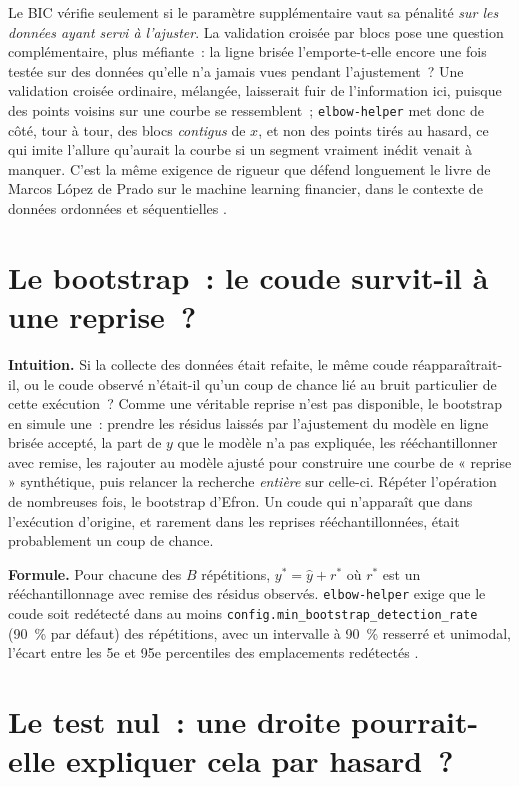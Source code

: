\documentclass[11pt]{article}
\newcommand{\code}[1]{\texttt{#1}}
\begin{document}
Le BIC vérifie seulement si le paramètre supplémentaire vaut sa pénalité
\emph{sur les données ayant servi à l'ajuster}. La validation croisée par
blocs pose une question complémentaire, plus méfiante~: la ligne brisée
l'emporte-t-elle encore une fois testée sur des données qu'elle n'a jamais
vues pendant l'ajustement~? Une validation croisée ordinaire, mélangée,
laisserait fuir de l'information ici, puisque des points voisins sur une
courbe se ressemblent~; \code{elbow-helper} met donc de côté, tour à tour,
des blocs \emph{contigus} de $x$, et non des points tirés au hasard, ce qui
imite l'allure qu'aurait la courbe si un segment vraiment inédit venait à
manquer. C'est la même exigence de rigueur que défend longuement le livre
de Marcos L\'opez de Prado sur le machine learning financier, dans le
contexte de données ordonnées et séquentielles
\citeyearpar{lopezdeprado2018financial}.

\section{Le bootstrap~: le coude survit-il à une reprise~?}

\textbf{Intuition.} Si la collecte des données était refaite, le même
coude réapparaîtrait-il, ou le coude observé n'était-il qu'un coup de
chance lié au bruit particulier de cette exécution~? Comme une véritable
reprise n'est pas disponible, le bootstrap en simule une~: prendre les
résidus laissés par l'ajustement du modèle en ligne brisée accepté, la part
de $y$ que le modèle n'a pas expliquée, les rééchantillonner avec remise,
les rajouter au modèle ajusté pour construire une courbe de « reprise »
synthétique, puis relancer la recherche \emph{entière} sur celle-ci.
Répéter l'opération de nombreuses fois, le bootstrap d'Efron. Un coude qui
n'apparaît que dans l'exécution d'origine, et rarement dans les reprises
rééchantillonnées, était probablement un coup de chance.

\textbf{Formule.} Pour chacune des $B$ répétitions, $y^\ast = \hat y +
r^\ast$ où $r^\ast$ est un rééchantillonnage avec remise des résidus
observés. \code{elbow-helper} exige que le coude soit redétecté dans au
moins \code{config.min\_bootstrap\_detection\_rate} (90~\% par défaut) des
répétitions, avec un intervalle à 90~\% resserré et unimodal, l'écart entre
les 5e et 95e percentiles des emplacements redétectés \citep{efron1979}
\citep{hastie2009esl}.

\section{Le test nul~: une droite pourrait-elle expliquer cela par hasard~?}
\label{sec:test-nul}
\end{document}
